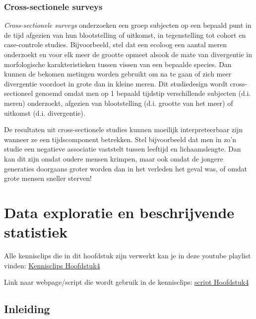 \documentclass[
  12pt,dutch,coursenotes]{book}
\theoremstyle{definition}
\theoremstyle{definition}
\theoremstyle{definition}
\theoremstyle{remark}
\begin{document}
\hypertarget{cross-sectionele-surveys}{%
\subsection{Cross-sectionele surveys}\label{cross-sectionele-surveys}}

\emph{Cross-sectionele surveys} onderzoeken een groep subjecten op een
bepaald punt in de tijd afgezien van hun blootstelling of uitkomst, in
tegenstelling tot cohort en case-controle studies. Bijvoorbeeld, stel dat een ecoloog een aantal meren onderzoekt en voor elk meer de grootte opmeet alsook de mate van divergentie in morfologische karakteristieken tussen vissen van een bepaalde species.
Dan kunnen de bekomen metingen worden gebruikt om na te gaan of zich meer divergentie voordoet in grote dan in kleine meren. Dit studiedesign wordt cross-sectioneel genoemd omdat men op 1 bepaald tijdstip verschillende subjecten (d.i. meren) onderzoekt, afgezien van blootstelling (d.i. grootte van het meer) of uitkomst (d.i. divergentie).

De resultaten uit cross-sectionele studies kunnen moeilijk interpreteerbaar zijn wanneer ze een tijdscomponent betrekken. Stel bijvoorbeeld dat men in zo'n studie een negatieve associatie
vaststelt tussen leeftijd en lichaamslengte. Dan kan dit zijn omdat oudere
mensen krimpen, maar ook omdat de jongere generaties doorgaans groter worden
dan in het verleden het geval was, of omdat grote mensen sneller sterven!

\hypertarget{chap:describe}{%
\chapter{Data exploratie en beschrijvende statistiek}\label{chap:describe}}

Alle kennisclips die in dit hoofdstuk zijn verwerkt kan je in deze youtube playlist vinden: \href{https://www.youtube.com/watch?v=AVd-8WE_DhU\&list=PLZH1hP8_LbJLKTeg_D9CHC3xbk0nfBa-1}{Kennisclips Hoofdstuk4}

Link naar webpage/script die wordt gebruik in de kennisclips: \href{https://statomics.github.io/sbc20/rmd/04-dataExploration.html}{script Hoofdstuk4}

\hypertarget{inleiding}{%
\section{Inleiding}\label{inleiding}}
\end{document}
